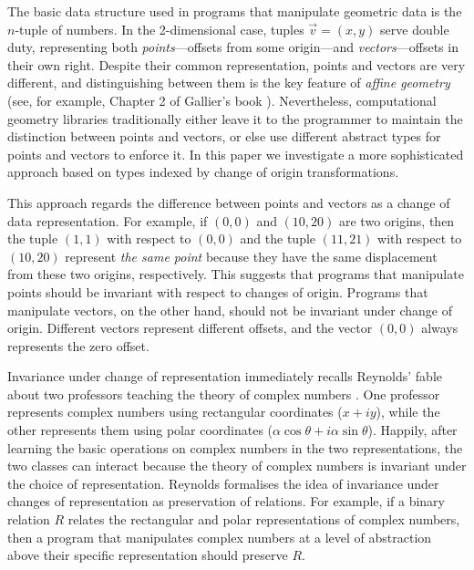 \documentclass{sigplanconf}
\theoremstyle{examplestyle}
\theoremstyle{restatementstyle}
\begin{document}
The basic data structure used in programs that manipulate geometric data is
the $n$-tuple of numbers. In the 2-dimensional case, tuples 
$\vec{v} = (x,y)$ serve double duty, representing
both \emph{points}---offsets from some origin---and
\emph{vectors}---offsets in their own right.  Despite their common
representation, points and vectors are very different, and
distinguishing between them is the key feature of \emph{affine
  geometry} (see, for example, Chapter 2 of Gallier's book
\cite{gallier11geometric}). Nevertheless, computational geometry
libraries traditionally either leave it to the programmer to maintain
the distinction between points and vectors, or else use different
abstract types for points and vectors to enforce it.
In this paper we investigate a more sophisticated approach based on 
types indexed by change of origin transformations.

This approach regards the difference between points and vectors as a
change of data representation. For example, if $(0,0)$ and $(10,20)$
are two origins, then the tuple $(1,1)$ with respect to $(0,0)$ and the
tuple $(11,21)$ with respect to $(10,20)$ represent \emph{the same
  point} because they have the same displacement from these two
origins, respectively.
This suggests that programs that manipulate points %
should be invariant with respect to changes of
origin. Programs that manipulate vectors, on the other hand, should
not be invariant under change of origin. Different vectors represent
different offsets, and the vector $(0,0)$ always represents the zero
offset.

Invariance under change of representation immediately recalls
Reynolds' fable about two professors teaching the theory of complex
numbers \cite{reynolds83types}. One professor represents complex
numbers using rectangular coordinates ($x + iy$), while the other
represents them using polar coordinates ($\alpha\cos\theta +
i\alpha\sin\theta$). Happily, after learning the basic operations on
complex numbers in the two representations, the two classes can
interact because the theory of complex numbers is invariant under the
choice of representation. Reynolds formalises the idea of invariance
under changes of representation as preservation of relations.  For
example, if a binary relation $R$ relates the rectangular and polar
representations of complex numbers, then a program that manipulates
complex numbers at a level of abstraction above their specific
representation should preserve $R$. %
\end{document}
